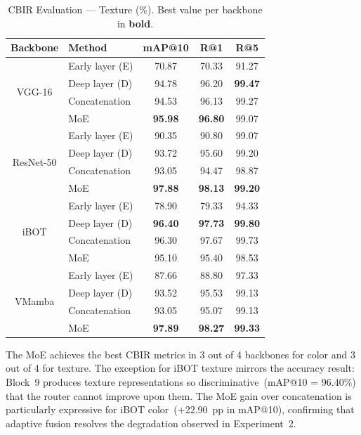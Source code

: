 \documentclass[conference]{IEEEtran}
\begin{document}
\begin{table}[htbp]
\caption{CBIR Evaluation --- Texture (\%). Best value per backbone in
         \textbf{bold}.}
\begin{center}
\begin{tabular}{c|l|c|c|c}
\hline
\textbf{Backbone} & \textbf{Method} & \textbf{mAP@10}
                  & \textbf{R@1} & \textbf{R@5} \\
\hline
\multirow{4}{*}{VGG-16}
  & Early layer (E)         & 70.87 & 70.33 & 91.27 \\
  & Deep layer (D)          & 94.78 & 96.20 & \textbf{99.47} \\
  & Concatenation           & 94.53 & 96.13 & 99.27 \\
  & MoE                     & \textbf{95.98} & \textbf{96.80} & 99.07 \\
\hline
\multirow{4}{*}{ResNet-50}
  & Early layer (E)         & 90.35 & 90.80 & 99.07 \\
  & Deep layer (D)          & 93.72 & 95.60 & 99.20 \\
  & Concatenation           & 93.05 & 94.47 & 98.87 \\
  & MoE                     & \textbf{97.88} & \textbf{98.13} & \textbf{99.20} \\
\hline
\multirow{4}{*}{iBOT}
  & Early layer (E)         & 78.90 & 79.33 & 94.33 \\
  & Deep layer (D)          & \textbf{96.40} & \textbf{97.73} & \textbf{99.80} \\
  & Concatenation           & 96.30 & 97.67 & 99.73 \\
  & MoE                     & 95.10 & 95.40 & 98.53 \\
\hline
\multirow{4}{*}{VMamba}
  & Early layer (E)         & 87.66 & 88.80 & 97.33 \\
  & Deep layer (D)          & 93.52 & 95.53 & 99.13 \\
  & Concatenation           & 93.05 & 95.07 & 99.13 \\
  & MoE                     & \textbf{97.89} & \textbf{98.27} & \textbf{99.33} \\
\hline
\end{tabular}
\label{tab_cbir_texture}
\end{center}
\end{table}

The MoE achieves the best CBIR metrics in 3 out of 4 backbones for color
and 3 out of 4 for texture.
The exception for iBOT texture mirrors the accuracy result: Block~9
produces texture representations so discriminative~(mAP@10 = 96.40\%)
that the router cannot improve upon them.
The MoE gain over concatenation is particularly expressive for iBOT
color~($+$22.90~pp in mAP@10), confirming that adaptive fusion resolves
the degradation observed in Experiment~2.
\end{document}
